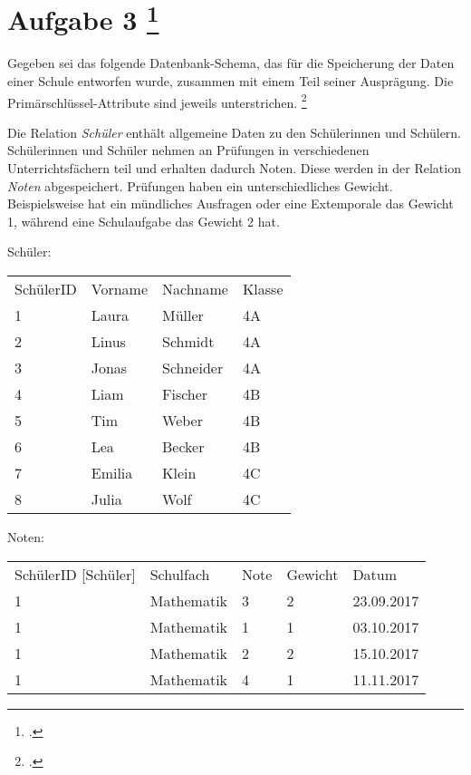 \documentclass{lehramt-informatik-aufgabe}
\begin{document}

\section{Aufgabe 3
\footcite[Thema 2 Teilaufgabe 2 Aufgabe 3]{46116:2018:09}
}

Gegeben sei das folgende Datenbank-Schema, das für die Speicherung der
Daten einer Schule entworfen wurde, zusammen mit einem Teil seiner
Ausprägung. Die Primärschlüssel-Attribute sind jeweils unterstrichen.
\footcite{db:ab:3}

Die Relation \emph{Schüler} enthält allgemeine Daten zu den
Schülerinnen und Schülern. Schülerinnen und Schüler nehmen an Prüfungen
in verschiedenen Unterrichtsfächern teil und erhalten dadurch Noten.
Diese werden in der Relation \emph{Noten} abgespeichert. Prüfungen haben
ein unterschiedliches Gewicht. Beispielsweise hat ein mündliches
Ausfragen oder eine Extemporale das Gewicht 1, während eine Schulaufgabe
das Gewicht 2 hat.

Schüler:

\begin{tabular}{llll}
SchülerID  & Vorname & Nachname  & Klasse \\
1          & Laura   & Müller    & 4A     \\
2          & Linus   & Schmidt   & 4A     \\
3          & Jonas   & Schneider & 4A     \\
4          & Liam    & Fischer   & 4B     \\
5          & Tim     & Weber     & 4B     \\
6          & Lea     & Becker    & 4B     \\
7          & Emilia  & Klein     & 4C     \\
8          & Julia   & Wolf      & 4C
\end{tabular}

Noten:

\begin{tabular}{lllll}
SchülerID {[}Schüler{]} & Schulfach  & Note & Gewicht & Datum      \\
1                       & Mathematik & 3    & 2       & 23.09.2017 \\
1                       & Mathematik & 1    & 1       & 03.10.2017 \\
1                       & Mathematik & 2    & 2       & 15.10.2017 \\
1                       & Mathematik & 4    & 1       & 11.11.2017
\end{tabular}
\end{document}

